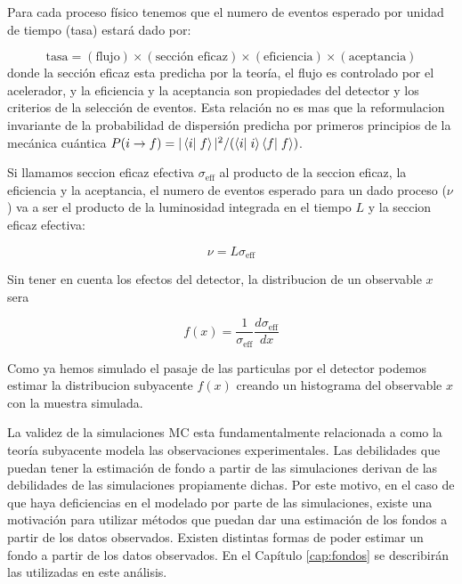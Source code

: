 Para cada proceso físico tenemos que el numero de eventos esperado por unidad de tiempo (tasa)
estará dado por:

\begin{equation}
  \text{tasa} = (\text{flujo}) \times (\text{sección eficaz}) \times (\text{eficiencia}) \times (\text{aceptancia})
\end{equation}
%
donde la sección eficaz esta predicha por la teoría, el flujo es controlado por
el acelerador, y la eficiencia y la aceptancia son propiedades del detector y los
criterios de la selección de eventos. Esta relación no es mas que la reformulacion
invariante de la probabilidad de dispersión predicha por primeros principios de la
mecánica cuántica $P(i\to f) = |\braket{i}{f}|^2/(\braket{i}{i}\braket{f}{f})$.

Si llamamos seccion eficaz efectiva $\sigma_\text{eff}$ al producto de la seccion eficaz,
la eficiencia y la aceptancia, el numero de eventos esperado para un dado proceso ($\nu$)
va a ser el producto de la luminosidad integrada en el tiempo $L$ y la seccion eficaz efectiva:

\begin{equation}
  \nu = L \sigma_\text{eff}
\end{equation}

Sin tener en cuenta los efectos del detector, la distribucion de un observable $x$ sera

\begin{equation}
 f(x) = \frac{1}{\sigma_\text{eff}} \frac{d\sigma_\text{eff}}{dx}
\end{equation}

Como ya hemos simulado el pasaje de las particulas por el detector podemos estimar
la distribucion subyacente $f(x)$ creando un histograma del observable $x$ con la muestra
simulada.

La validez de la simulaciones MC esta fundamentalmente relacionada a como la teoría
subyacente modela las observaciones experimentales. Las debilidades que puedan tener
la estimación de fondo a partir de las simulaciones derivan de las debilidades
de las simulaciones propiamente dichas. Por este motivo, en el caso de que haya
deficiencias en el modelado por parte de las simulaciones, existe una motivación
para utilizar métodos que puedan dar una estimación de los fondos a partir de los
datos observados. Existen distintas formas de poder estimar un fondo a partir
de los datos observados. En el Capítulo \ref{cap:fondos} se describirán las utilizadas
en este análisis.

